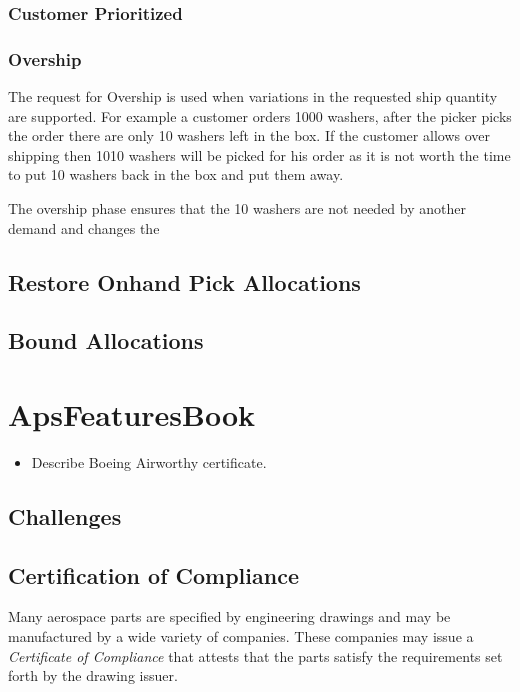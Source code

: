 \documentclass[letterpaper,10pt,english]{sphinxmanual}
\begin{document}
\subsection{Customer Prioritized}
\label{APS/AllocationLogic:customer-prioritized}

\subsection{Overship}
\label{APS/AllocationLogic:overship}
The request for Overship is used when variations in the requested ship
quantity are supported. For example a customer orders 1000 washers,
after the picker picks the order there are only 10 washers left in the
box. If the customer allows over shipping then 1010 washers will be
picked for his order as it is not worth the time to put 10 washers back
in the box and put them away.

The overship phase ensures that the 10 washers are not needed by another
demand and changes the


\section{Restore Onhand Pick Allocations}
\label{APS/AllocationLogic:restore-onhand-pick-allocations}

\section{Bound Allocations}
\label{APS/AllocationLogic:bound-allocations}

\chapter{ApsFeaturesBook}
\label{APS/ApsFeatures:apsfeaturesbook}\label{APS/ApsFeatures::doc}\begin{itemize}
\item {} 
Describe Boeing Airworthy certificate.

\end{itemize}


\section{Challenges}
\label{APS/ApsFeatures:challenges}

\section{Certification of Compliance}
\label{APS/ApsFeatures:certification-of-compliance}
Many aerospace parts are specified by engineering drawings and may be
manufactured by a wide variety of companies. These companies may issue a
\emph{Certificate of Compliance} that attests that the parts satisfy the
requirements set forth by the drawing issuer.
\end{document}
